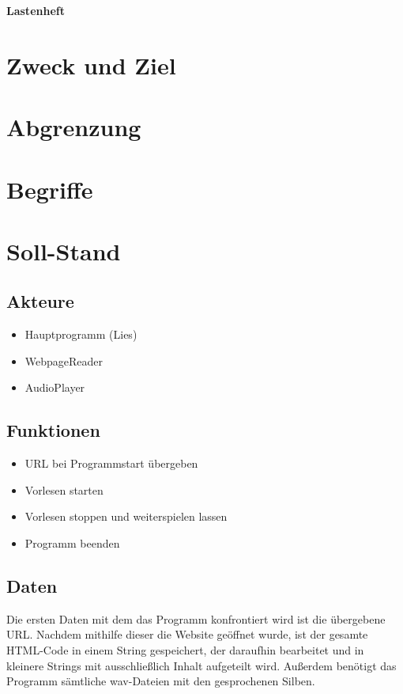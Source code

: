\documentclass[11pt]{scrartcl}
\begin{document}
\begin{center}
\textbf{Lastenheft}
\end{center}

\section{Zweck und Ziel}


\section{Abgrenzung}


\section{Begriffe}


\section{Soll-Stand}


\subsection{Akteure}

\begin{itemize}
	\item Hauptprogramm (Lies)
	\item WebpageReader
	\item AudioPlayer
\end{itemize}

\subsection{Funktionen}

\begin{itemize}
	\item URL bei Programmstart übergeben
	\item Vorlesen starten
	\item Vorlesen stoppen und weiterspielen lassen
	\item Programm beenden
\end{itemize}

\subsection{Daten}

Die ersten Daten mit dem das Programm konfrontiert wird ist die übergebene URL. Nachdem mithilfe dieser
die Website geöffnet wurde, ist der gesamte HTML-Code in einem String gespeichert, der daraufhin bearbeitet
und in kleinere Strings mit ausschließlich Inhalt aufgeteilt wird. Außerdem benötigt das Programm sämtliche
wav-Dateien mit den gesprochenen Silben.
\end{document}
